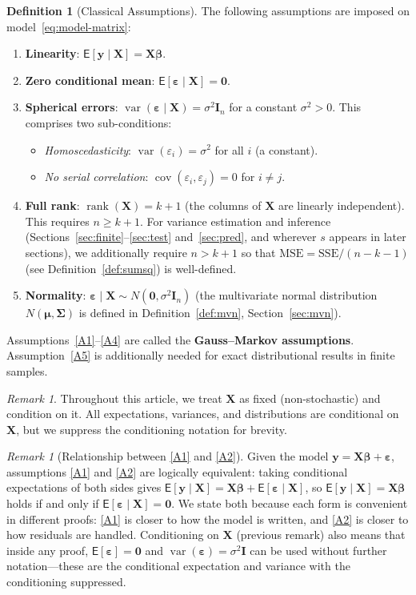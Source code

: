 \documentclass[14pt]{extarticle}
\theoremstyle{plain}
\theoremstyle{definition}
\newtheorem{definition}[theorem]{Definition}
\theoremstyle{remark}
\newtheorem{remark}[theorem]{Remark}
\newcommand\expc{\mathsf{E}}
\DeclareMathOperator\var{var}
\DeclareMathOperator\cov{cov}
\DeclareMathOperator\rank{rank}
\newcommand{\SSE}{\mathrm{SSE}}
\newcommand{\MSE}{\mathrm{MSE}}
\newcommand{\bX}{\mathbf{X}}
\newcommand{\by}{\mathbf{y}}
\def\bb{\boldsymbol{\beta}}
\newcommand{\be}{\boldsymbol{\varepsilon}}
\newcommand{\bI}{\mathbf{I}}
\newcommand{\bzero}{\mathbf{0}}
\begin{document}
\begin{definition}[Classical Assumptions]\label{def:assumptions}
The following assumptions are imposed on model~\eqref{eq:model-matrix}:
\begin{enumerate}[label=\textup{(A\arabic*)}]
\item\label{A1} \textbf{Linearity}: $\expc[\by \mid \bX] = \bX\bb$.
\item\label{A2} \textbf{Zero conditional mean}: $\expc[\be \mid \bX] = \bzero$.
\item\label{A3} \textbf{Spherical errors}: $\var(\be \mid \bX) = \sigma^2 \bI_n$ for a constant $\sigma^2 > 0$. This comprises two sub-conditions:
\begin{itemize}
    \item \emph{Homoscedasticity}: $\var(\varepsilon_i) = \sigma^2$ for all $i$ (a constant).
    \item \emph{No serial correlation}: $\cov(\varepsilon_i, \varepsilon_j) = 0$ for $i \neq j$.
\end{itemize}
\item\label{A4} \textbf{Full rank}: $\rank(\bX) = k + 1$ (the columns of $\bX$ are linearly independent). This requires $n \geqslant k + 1$. For variance estimation and inference (Sections~\ref{sec:finite}--\ref{sec:test} and~\ref{sec:pred}, and wherever $s$ appears in later sections), we additionally require $n > k + 1$ so that $\MSE = \SSE/(n-k-1)$ (see Definition~\ref{def:sumsq}) is well-defined.
\item\label{A5} \textbf{Normality}: $\be \mid \bX \sim N(\bzero, \sigma^2 \bI_n)$ (the multivariate normal distribution $N(\boldsymbol\mu, \boldsymbol\Sigma)$ is defined in Definition~\ref{def:mvn}, Section~\ref{sec:mvn}).
\end{enumerate}
Assumptions~\ref{A1}--\ref{A4} are called the \textbf{Gauss--Markov assumptions}. Assumption~\ref{A5} is additionally needed for exact distributional results in finite samples.
\end{definition}

\begin{remark}\label{rem:fixed-X}
Throughout this article, we treat $\bX$ as fixed (non-stochastic) and condition on it. All expectations, variances, and distributions are conditional on $\bX$, but we suppress the conditioning notation for brevity.
\end{remark}

\begin{remark}[Relationship between \ref{A1} and \ref{A2}]\label{rem:A1-A2}
Given the model $\by = \bX\bb + \be$, assumptions \ref{A1} and \ref{A2} are logically equivalent: taking conditional expectations of both sides gives $\expc[\by\mid\bX] = \bX\bb + \expc[\be\mid\bX]$, so $\expc[\by\mid\bX] = \bX\bb$ holds if and only if $\expc[\be\mid\bX] = \bzero$. We state both because each form is convenient in different proofs: \ref{A1} is closer to how the model is written, and \ref{A2} is closer to how residuals are handled. Conditioning on $\bX$ (previous remark) also means that inside any proof, $\expc[\be] = \bzero$ and $\var(\be) = \sigma^2\bI$ can be used without further notation---these are the conditional expectation and variance with the conditioning suppressed.
\end{remark}
\end{document}
